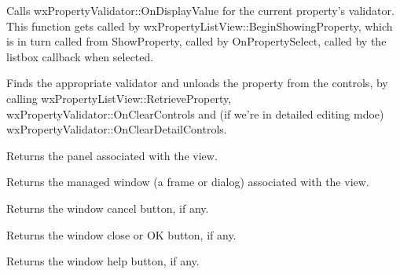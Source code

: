 \label{wxpropertylistviewdisplayproperty}


Calls wxPropertyValidator::OnDisplayValue for the current property's validator. This function
gets called by wxPropertyListView::BeginShowingProperty, which is in turn called
from ShowProperty, called by OnPropertySelect, called by the listbox callback when selected.

\label{wxpropertylistviewendshowingproperty}


Finds the appropriate validator and unloads the property from the controls, by calling
wxPropertyListView::RetrieveProperty, wxPropertyValidator::OnClearControls and (if we're in
detailed editing mdoe) wxPropertyValidator::OnClearDetailControls.

\label{wxpropertylistviewgetpanel}


Returns the panel associated with the view.

\label{wxpropertylistviewgetmanagedwindow}


Returns the managed window (a frame or dialog) associated with the view.

\label{wxpropertylistviewgetwindowcancelbutton}


Returns the window cancel button, if any.

\label{wxpropertylistviewgetwindowclosebutton}


Returns the window close or OK button, if any.

\label{wxpropertylistviewgetwindowhelpbutton}


Returns the window help button, if any.

